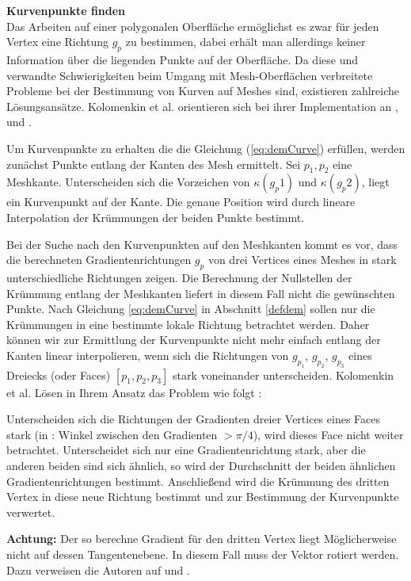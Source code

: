 \documentclass{paperStyle}
\begin{document}
 \textbf{Kurvenpunkte finden}\\
 Das Arbeiten auf einer polygonalen Oberfläche ermöglichst es zwar für jeden Vertex eine Richtung $g_p$ zu bestimmen, dabei erhält man allerdings keiner Information über die liegenden Punkte auf der Oberfläche. Da diese und verwandte Schwierigkeiten beim Umgang mit Mesh-Oberflächen verbreitete Probleme bei der Bestimmung von Kurven auf Meshes sind, existieren zahlreiche Lösungsansätze. Kolomenkin et al. orientieren sich bei ihrer Implementation an \cite{Ohtake}, \cite{DeCarlo:2007:HLF} und \cite{JuddDA07}.
 
  Um Kurvenpunkte zu erhalten die die Gleichung (\ref{eq:demCurve}) erfüllen, werden zunächst Punkte entlang der Kanten des Mesh ermittelt. Sei $p_1,p_2$ eine Meshkante. Unterscheiden sich die Vorzeichen von $\kappa(g_p1)$ und $\kappa(g_p2)$, liegt ein Kurvenpunkt auf der Kante. Die genaue Position wird durch lineare Interpolation der Krümmungen der beiden Punkte bestimmt.
 
 Bei der Suche nach den Kurvenpunkten auf den Meshkanten kommt es vor, dass die berechneten Gradientenrichtungen $g_p$ von drei Vertices eines Meshes in stark unterschiedliche Richtungen zeigen. Die Berechnung der Nullstellen der Krümmung entlang der Meshkanten liefert in diesem Fall nicht die gewünschten Punkte. Nach Gleichung \ref{eq:demCurve} in Abschnitt \ref{defdem} sollen nur die Krümmungen in eine bestimmte lokale Richtung betrachtet werden. Daher können wir zur Ermittlung der Kurvenpunkte nicht mehr einfach entlang der Kanten linear interpolieren, wenn sich die Richtungen von $g_{p_1}$, $g_{p_2}$, $g_{p_3}$ eines Dreiecks (oder Faces) $[p_1, p_2, p_3]$ stark voneinander unterscheiden. Kolomenkin et al. Lösen in Ihrem Ansatz das Problem wie folgt \cite{Demarcating}: 
 
 Unterscheiden sich die Richtungen der Gradienten dreier Vertices eines Faces stark (in \cite{Demarcating}: Winkel zwischen den Gradienten $> \pi/4$), wird dieses Face nicht weiter betrachtet. Unterscheidet sich nur eine Gradientenrichtung stark, aber die anderen beiden sind sich ähnlich, so wird der Durchschnitt der beiden ähnlichen Gradientenrichtungen bestimmt. Anschließend wird die Krümmung des dritten Vertex in diese neue Richtung bestimmt und zur Bestimmung der Kurvenpunkte verwertet. 
 
 \textbf{Achtung:} Der so berechne Gradient für den dritten Vertex liegt Möglicherweise nicht auf dessen Tangentenebene. In diesem Fall muss der Vektor rotiert werden. Dazu verweisen die Autoren auf \cite{CurvDeriv2004} und \cite{Ohtake}.
 
\end{document}
